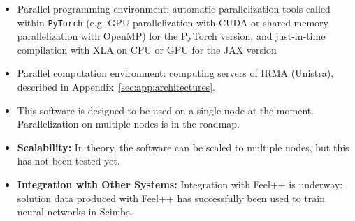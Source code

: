 \begin{itemize}
    \item Parallel programming environment:
          automatic parallelization tools called within \texttt{PyTorch}
          (e.g. GPU parallelization with CUDA or shared-memory parallelization with OpenMP)
          for the PyTorch version, and just-in-time compilation with XLA
          on CPU or GPU for the JAX version
    \item Parallel computation environment: computing servers of IRMA (Unistra), described in Appendix~\ref{sec:app:architectures}.
    \item This software is designed to be used on a single node at the moment.
          Parallelization on multiple nodes is in the roadmap.
    \item \textbf{Scalability:}
          In theory, the software can be scaled to multiple nodes, but this has not been tested yet.
    \item \textbf{Integration with Other Systems:}
          Integration with Feel++ is underway:
          solution data produced with Feel++ has successfully been
          used to train neural networks in Scimba.
\end{itemize}




